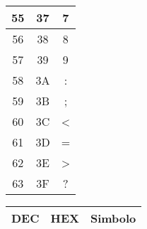 {\begin{table}[H]
\begin{minipage}[t]{.32\textwidth}
\begin{tabular}{ccc}
        55  & 37 & 7                   \\ \hline
        56  & 38 & 8                   \\ \hline
        57  & 39 & 9                   \\ \hline
        58  & 3A & :                   \\ \hline
        59  & 3B & ;                   \\ \hline
        60  & 3C & <                   \\ \hline
        61  & 3D & =                   \\ \hline
        62  & 3E & >                   \\ \hline
        63  & 3F & ?                   \\ \hline
        
      \end{tabular}
    \end{minipage}
    \begin{minipage}[t]{.32\textwidth}
      \begin{tabular}{ccc}
        \hline\hline\textbf{DEC} & \textbf{HEX} & \textbf{Simbolo} \\\hline\hline
        

\end{tabular}
\end{minipage}
\end{table}}

